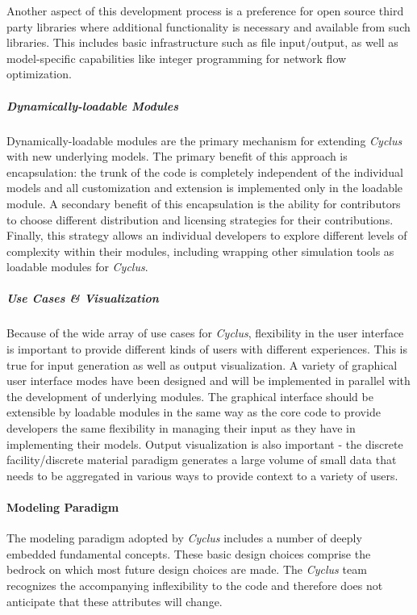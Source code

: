 \documentclass[letterpaper,10pt,english]{sphinxmanual}
\begin{document}
Another aspect of this development process is a preference for open source
third party libraries where additional functionality is necessary and available
from such libraries.  This includes basic infrastructure such as file
input/output, as well as model-specific capabilities like integer programming
for network flow optimization.


\subparagraph{Dynamically-loadable Modules}
\label{basics/introduction:dynamically-loadable-modules}
Dynamically-loadable modules are the primary mechanism for extending \emph{Cyclus}
with new underlying models.  The primary benefit of this approach is
encapsulation: the trunk of the code is completely independent of the
individual models and all customization and extension is implemented only in
the loadable module.  A secondary benefit of this encapsulation is the ability
for contributors to choose different distribution and licensing strategies for
their contributions.  Finally, this strategy allows an individual developers
to explore different levels of complexity within their modules, including
wrapping other simulation tools as loadable modules for \emph{Cyclus}.


\subparagraph{Use Cases \& Visualization}
\label{basics/introduction:use-cases-visualization}
Because of the wide array of use cases for \emph{Cyclus}, flexibility in the user
interface is important to provide different kinds of users with different
experiences.  This is true for input generation as well as output
visualization.  A variety of graphical user interface modes have been designed
and will be implemented in parallel with the development of underlying modules.
The graphical interface should be extensible by loadable modules in the same
way as the core code to provide developers the same flexibility in managing
their input as they have in implementing their models.  Output visualization is
also important - the discrete facility/discrete material paradigm generates a
large volume of small data that needs to be aggregated in various ways to
provide context to a variety of users.


\paragraph{Modeling Paradigm}
\label{basics/introduction:modeling-paradigm}
The modeling paradigm adopted by \emph{Cyclus} includes a number of deeply embedded
fundamental concepts.  These basic design choices comprise the bedrock on which
most future design choices are made. The \emph{Cyclus} team recognizes the
accompanying inflexibility to the code and therefore does not anticipate that
these attributes will change.
\end{document}
